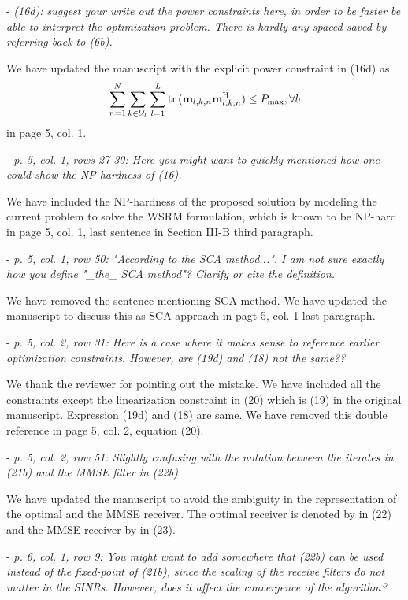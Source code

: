 \begin{itemize}
\begin{itemize}
 - \textit{(16d): suggest your write out the power constraints here, in order to be faster be able to interpret the optimization problem. There is hardly any spaced saved by referring back to (6b).}

\resp We have updated the manuscript with the explicit power constraint in (16d) as
\[\sum_{n = 1}^N \sum_{k \in \mathcal{U}_b} \sum_{l=1}^L \mathrm{tr} \, (\mathbf{m}_{l,k,n} \mathbf{m}_{l,k,n}^{\mathrm{H}}) \leq P_{{\max}}, \forall b\]
in page 5, col. 1.

 - \textit{p. 5, col. 1, rows 27-30: Here you might want to quickly mentioned how one could show the NP-hardness of (16).}

\resp We have included the NP-hardness of the proposed solution by modeling the current problem to solve the \ac{WSRM} formulation, which is known to be NP-hard in page 5, col. 1, last sentence in Section III-B third paragraph. 

 - \textit{p. 5, col. 1, row 50: "According to the SCA method...". I am not sure exactly how you define "\_the\_ SCA method"? Clarify or cite the definition.}

\resp We have removed the sentence mentioning SCA method. We have updated the manuscript to discuss this as SCA approach in pagt 5, col. 1 last paragraph.

 - \textit{p. 5, col. 2, row 31: Here is a case where it makes sense to reference earlier optimization constraints. However, are (19d) and (18) not the same??}

\resp We thank the reviewer for pointing out the mistake. We have included all the constraints except the linearization constraint in (20) which is (19) in the original manuscript. Expression (19d) and (18) are same. We have removed this double reference in page 5, col. 2, equation (20).

 - \textit{p. 5, col. 2, row 51: Slightly confusing with the notation between the iterates in (21b) and the MMSE filter in (22b).}

\resp We have updated the manuscript to avoid the ambiguity in the representation of the optimal and the MMSE receiver. The optimal receiver is denoted by  in (22) and the MMSE receiver by  in (23).

 - \textit{p. 6, col. 1, row 9: You might want to add somewhere that (22b) can be used instead of the fixed-point of (21b), since the scaling of the receive filters do not matter in the SINRs. However, does it affect the convergence of the algorithm?}


\end{itemize}
\end{itemize}
